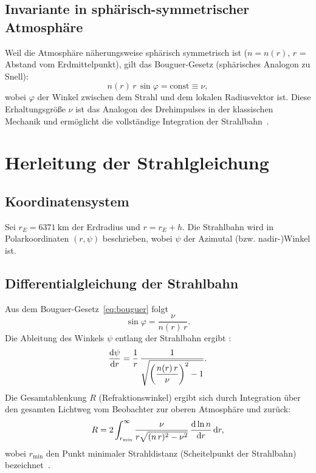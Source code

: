 ﻿\documentclass[12pt,a4paper]{article}
\begin{document}
\subsection{Invariante in sphärisch-symmetrischer Atmosphäre}

Weil die Atmosphäre näherungsweise sphärisch symmetrisch ist
($n = n(r)$, $r$ = Abstand vom Erdmittelpunkt),
gilt das Bouguer-Gesetz (sphärisches Analogon zu Snell):
\begin{equation}
  \boxed{n(r)\,r\,\sin\varphi = \mathrm{const} \equiv \nu,}
  \label{eq:bouguer}
\end{equation}
wobei $\varphi$ der Winkel zwischen dem Strahl und dem lokalen
Radiusvektor ist.
Diese Erhaltungsgröße $\nu$ ist das Analogon des Drehimpulses
in der klassischen Mechanik und ermöglicht die vollständige
Integration der Strahlbahn~\citep{Smart1977}.

\section{Herleitung der Strahlgleichung}
\label{sec:strahglgn}

\subsection{Koordinatensystem}

Sei $r_E = \SI{6371}{\kilo\metre}$ der Erdradius und $r = r_E + h$.
Die Strahlbahn wird in Polarkoordinaten $(r, \psi)$ beschrieben,
wobei $\psi$ der Azimutal (bzw. nadir-)Winkel ist.

\subsection{Differentialgleichung der Strahlbahn}

Aus dem Bouguer-Gesetz~\eqref{eq:bouguer} folgt
\begin{equation}
  \sin\varphi = \frac{\nu}{n(r)\,r}.
  \label{eq:sin_phi}
\end{equation}
Die Ableitung des Winkels $\psi$ entlang der Strahlbahn ergibt
\citep{Ramsauer1932}:
\begin{equation}
  \dv{\psi}{r} = \frac{1}{r}\,
  \frac{1}{\sqrt{ \left(\dfrac{n(r)\,r}{\nu}\right)^{2} - 1 }}.
  \label{eq:dpsi_dr}
\end{equation}
Die Gesamtablenkung $R$ (Refraktionswinkel) ergibt sich durch
Integration über den gesamten Lichtweg vom Beobachter
zur oberen Atmosphäre und zurück:
\begin{equation}
  R = 2\int_{r_{\min}}^{\infty}
  \frac{\nu}{r\sqrt{(n\,r)^{2}-\nu^{2}}}\,
  \dv{\ln n}{r}\,\dd r,
  \label{eq:R_integral}
\end{equation}
wobei $r_{\min}$ den Punkt minimaler Strahldistanz
(Scheitelpunkt der Strahlbahn) bezeichnet~\citep{Hohenkerk1988}.
\end{document}
